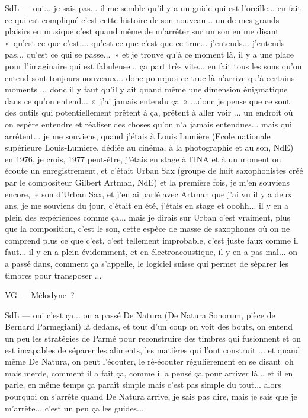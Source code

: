 SdL — oui... je sais pas... il me semble qu'il y a un guide qui est l'oreille... en fait ce qui est compliqué c'est cette histoire de son nouveau... un de mes grands plaisirs en musique c'est quand même de m'arrêter sur un son en me disant « qu'est ce que c'est.... qu'est ce que c'est que ce truc... j'entends... j'entends pas... qu'est ce qui se passe... » et je trouve qu'à ce moment là, il y a une place pour l'imaginaire qui est fabuleuse... ça part très vite... en fait tous les sons qu'on entend sont toujours nouveaux... donc pourquoi ce truc là n'arrive qu'à certains moments ... donc il y faut qu'il y ait quand même une dimension énigmatique dans ce qu'on entend... « j'ai jamais entendu ça » ...donc je pense que ce sont des outils qui potentiellement prêtent à ça, prêtent à aller voir ... un endroit où on espère entendre et réaliser des choses qu'on n'a jamais entendues... mais qui arrêtent... je me souviens, quand j'étais à Louis Lumière (Ecole nationale supérieure Louis-Lumiere, dédiée au cinéma, à la photographie et au son, NdE) en 1976, je crois, 1977 peut-être, j'étais en stage à l'INA et à un moment on écoute un enregistrement, et c'était Urban Sax (groupe de huit saxophonistes créé par le compositeur Gilbert Artman, NdE) et la première fois, je m'en souviens encore, le son d'Urban Sax, et j'en ai parlé avec Artman que j'ai vu il y a deux ans, je me souviens du jour, c'était en été, j'étais en stage et ooohh... il y en a plein des expériences comme ça... mais je dirais sur Urban c'est vraiment, plus que la composition, c'est le son, cette espèce de masse de saxophones où on ne comprend plus ce que c'est, c'est tellement improbable, c'est juste faux comme il faut... il y en a plein évidemment, et en électroacoustique, il y en a pas mal... on a passé dans, comment ça s'appelle, le logiciel suisse qui permet de séparer les timbres pour transposer ... 

VG — Mélodyne ? 

SdL — oui c'est ça... on a passé De Natura (De Natura Sonorum, pièce de Bernard Parmegiani) là dedans, et tout d'un coup on voit des bouts, on entend un peu les stratégies de Parmé pour reconstruire des timbres qui fusionnent et on est incapables de séparer les aliments, les matières qui l'ont construit ... et quand même De Natura, on peut l'écouter, le ré-écouter régulièrement en se disant oh mais merde, comment il a fait ça,  comme il a pensé ça pour arriver là... et il en parle, en même temps ça paraît simple mais c'est pas simple du tout... alors pourquoi on s'arrête quand De Natura arrive, je sais pas dire, mais je sais que je m'arrête... c'est un peu ça les guides... 

